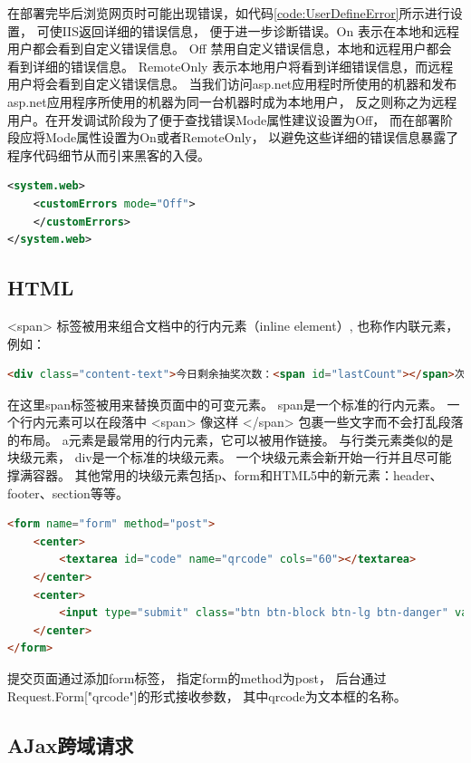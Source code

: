 \documentclass{book}
\begin{document}
在部署完毕后浏览网页时可能出现错误，如代码\ref{code:UserDefineError}所示进行设置，
可使IIS返回详细的错误信息，
便于进一步诊断错误。On 表示在本地和远程用户都会看到自定义错误信息。
Off 禁用自定义错误信息，本地和远程用户都会看到详细的错误信息。
RemoteOnly 表示本地用户将看到详细错误信息，而远程用户将会看到自定义错误信息。
当我们访问asp.net应用程时所使用的机器和发布asp.net应用程序所使用的机器为同一台机器时成为本地用户，
反之则称之为远程用户。在开发调试阶段为了便于查找错误Mode属性建议设置为Off，
而在部署阶段应将Mode属性设置为On或者RemoteOnly，
以避免这些详细的错误信息暴露了程序代码细节从而引来黑客的入侵。

\begin{lstlisting}[language=XML,caption=自定义错误设置,label={code:UserDefineError}]
<system.web>   
	<customErrors mode="Off">
	</customErrors> 
</system.web>
\end{lstlisting}

\subsection{HTML}

<span> 标签被用来组合文档中的行内元素（inline element）,
也称作内联元素，例如：

\begin{lstlisting}[language=HTML]
<div class="content-text">今日剩余抽奖次数：<span id="lastCount"></span>次</div>
\end{lstlisting}

在这里span标签被用来替换页面中的可变元素。
span是一个标准的行内元素。
一个行内元素可以在段落中 <span> 像这样 </span> 包裹一些文字而不会打乱段落的布局。 
a元素是最常用的行内元素，它可以被用作链接。
与行类元素类似的是块级元素，
div是一个标准的块级元素。
一个块级元素会新开始一行并且尽可能撑满容器。
其他常用的块级元素包括p、form和HTML5中的新元素：header、footer、section等等。 

\begin{lstlisting}[language=HTML]
<form name="form" method="post">
    <center>
        <textarea id="code" name="qrcode" cols="60"></textarea>
    </center>
    <center>
        <input type="submit" class="btn btn-block btn-lg btn-danger" value="点击验证" />
    </center>
</form>
\end{lstlisting}

提交页面通过添加form标签，
指定form的method为post，
后台通过Request.Form["qrcode"]的形式接收参数，
其中qrcode为文本框的名称。

\subsection{AJax跨域请求}
\end{document}
